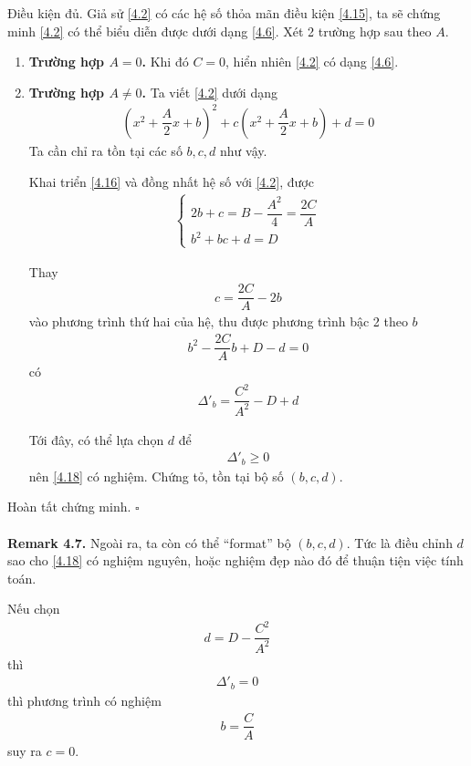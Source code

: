 \documentclass[a4paper,oneside]{book}
\numberwithin{equation}{chapter}
\begin{document}
Điều kiện đủ. Giả sử \eqref{4.2} có các hệ số thỏa mãn điều kiện \eqref{4.15}, ta sẽ chứng minh \eqref{4.2} có thể biểu diễn được dưới dạng \eqref{4.6}.
Xét 2 trường hợp sau theo $A$.
\begin{enumerate}
\item \textbf{Trường hợp $A = 0$.} Khi đó $C = 0$, hiển nhiên \eqref{4.2} có dạng \eqref{4.6}.
\item \textbf{Trường hợp $A \ne 0$.} Ta viết \eqref{4.2} dưới dạng
\begin{align}
\label{4.16}
{\left( {{x^2} + \dfrac{A}{2}x + b} \right)^2} + c\left( {{x^2} + \dfrac{A}{2}x + b} \right) + d = 0
\end{align}
Ta cần chỉ ra tồn tại các số $b,c,d$ như vậy.

Khai triển \eqref{4.16} và đồng nhất hệ số với \eqref{4.2}, được
\begin{align}
\label{4.17}
\left\{ {\begin{array}{*{20}{c}}
{2b + c = B - \dfrac{{{A^2}}}{4} = \dfrac{{2C}}{A}}\\
{{b^2} + bc + d = D}
\end{array}} \right.
\end{align}

Thay 
\begin{align}
c = \dfrac{{2C}}{A} - 2b
\end{align}
vào phương trình thứ hai của hệ, thu được phương trình bậc 2 theo $b$
\begin{align}
\label{4.18}
{b^2} - \dfrac{{2C}}{A}b + D - d = 0
\end{align}
có 
\begin{align}
\Delta {'_b} = \dfrac{{{C^2}}}{{{A^2}}} - D + d
\end{align}

Tới đây, có thể lựa chọn $d$ để 
\begin{align}
\Delta {'_b} \ge 0
\end{align}
nên \eqref{4.18} có nghiệm. Chứng tỏ, tồn tại bộ số $\left( {b,c,d} \right)$.
\end{enumerate}
Hoàn tất chứng minh. \hfill $\square$\\
\\
\textbf{Remark 4.7.} Ngoài ra, ta còn có thể ``format'' bộ $\left( {b,c,d} \right)$. Tức là điều chỉnh $d$ sao cho \eqref{4.18} có nghiệm nguyên, hoặc nghiệm đẹp nào đó để thuận tiện việc tính toán.

Nếu chọn 
\begin{align}
d = D - \dfrac{{{C^2}}}{{{A^2}}}
\end{align}
thì
\begin{align}
\Delta {'_b} = 0
\end{align}
thì phương trình có nghiệm 
\begin{align}
b = \dfrac{C}{A}
\end{align}
suy ra $c = 0$.
\end{document}
